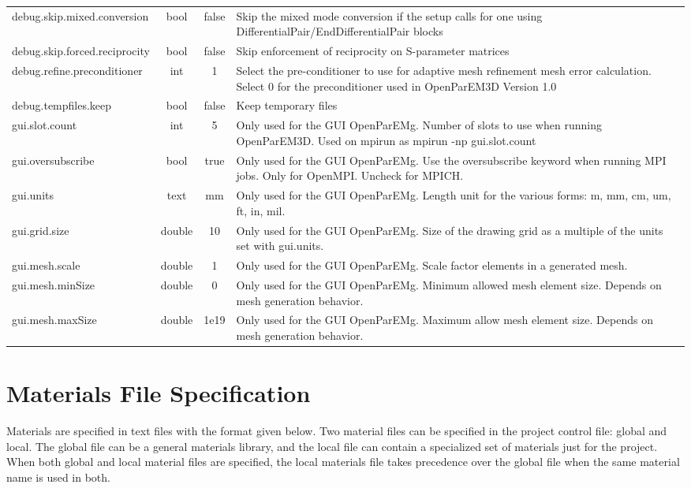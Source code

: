 \documentclass[titlepage]{article}
\renewcommand\_{\textunderscore\linebreak[1]}
\begin{document}
\begin{longtable}[c]{|lccp{8cm}|}
    debug.skip.mixed.conversion   & bool   & false  & Skip the mixed mode conversion if the setup calls for one using DifferentialPair/EndDifferentialPair blocks \\
    debug.skip.forced.reciprocity & bool   & false  & Skip enforcement of reciprocity on S-parameter matrices \\
    debug.refine.preconditioner   & int    & 1      & Select the pre-conditioner to use for adaptive mesh refinement mesh error calculation.  Select 0 for the preconditioner used in OpenParEM3D Version 1.0 \\
    debug.tempfiles.keep          & bool   & false  & Keep temporary files \\
    gui.slot.count                & int    & 5      & Only used for the GUI OpenParEMg. Number of slots to use when running OpenParEM3D.  Used on mpirun as mpirun -np gui.slot.count \\
    gui.oversubscribe             & bool   & true   & Only used for the GUI OpenParEMg. Use the oversubscribe keyword when running MPI jobs.  Only for OpenMPI.  Uncheck for MPICH. \\
    gui.units                     & text   & mm     & Only used for the GUI OpenParEMg. Length unit for the various forms: m, mm, cm, um, ft, in, mil. \\
    gui.grid.size                 & double & 10     & Only used for the GUI OpenParEMg. Size of the drawing grid as a multiple of the units set with gui.units. \\ 
    gui.mesh.scale                & double & 1      & Only used for the GUI OpenParEMg. Scale factor elements in a generated mesh. \\
    gui.mesh.minSize              & double & 0      & Only used for the GUI OpenParEMg. Minimum allowed mesh element size.  Depends on mesh generation behavior. \\
    gui.mesh.maxSize              & double & 1e19   & Only used for the GUI OpenParEMg. Maximum allow mesh element size.  Depends on mesh generation behavior. \\

    \hline
\end{longtable}

\newpage
\section{Materials File Specification}
\label{sec:materials_file_spec}

Materials are specified in text files with the format given below.  Two material files can be specified in the project control file: global and local.  The global file can be a general materials library, and the local file can contain a specialized set of materials just for the project.  When both global and local material files are specified, the local materials file takes precedence over the global file when the same material name is used in both.
\end{document}
